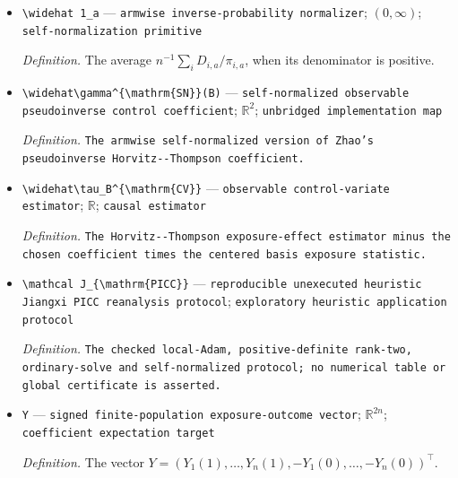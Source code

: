 \documentclass{article}
\begin{document}
\begin{itemize}
  \item \texttt{\textbackslash{}\allowbreak{}widehat 1\_\allowbreak{}a} --- \texttt{armwise inverse-\allowbreak{}probability normalizer}; \((0,\infty)\); \texttt{self-\allowbreak{}normalization primitive}
  \par\smallskip\noindent\emph{Definition.} The average \(n^{-1}\sum_iD_{i,a}/\pi_{i,a}\), when its denominator is positive.
  \item \texttt{\textbackslash{}\allowbreak{}widehat\textbackslash{}\allowbreak{}gamma\textasciicircum{}\{\textbackslash{}\allowbreak{}mathrm\{SN\}\allowbreak{}\}\allowbreak{}(B)} --- \texttt{self-\allowbreak{}normalized observable pseudoinverse control coefficient}; \(\mathbb R^2\); \texttt{unbridged implementation map}
  \par\smallskip\noindent\emph{Definition.} \texttt{The armwise self-\allowbreak{}normalized version of Zhao's pseudoinverse Horvitz-\allowbreak{}-\allowbreak{}Thompson coefficient.}
  \item \texttt{\textbackslash{}\allowbreak{}widehat\textbackslash{}\allowbreak{}tau\_\allowbreak{}B\textasciicircum{}\{\textbackslash{}\allowbreak{}mathrm\{CV\}\allowbreak{}\}\allowbreak{}} --- \texttt{observable control-\allowbreak{}variate estimator}; \(\mathbb R\); \texttt{causal estimator}
  \par\smallskip\noindent\emph{Definition.} \texttt{The Horvitz-\allowbreak{}-\allowbreak{}Thompson exposure-\allowbreak{}effect estimator minus the chosen coefficient times the centered basis exposure statistic.}
  \item \texttt{\textbackslash{}\allowbreak{}mathcal J\_\allowbreak{}\{\textbackslash{}\allowbreak{}mathrm\{PICC\}\allowbreak{}\}\allowbreak{}} --- \texttt{reproducible unexecuted heuristic Jiangxi PICC reanalysis protocol}; \texttt{exploratory heuristic application protocol}
  \par\smallskip\noindent\emph{Definition.} \texttt{The checked local-\allowbreak{}Adam,\allowbreak{} positive-\allowbreak{}definite rank-\allowbreak{}two,\allowbreak{} ordinary-\allowbreak{}solve and self-\allowbreak{}normalized protocol;\allowbreak{} no numerical table or global certificate is asserted.}
  \item \texttt{Y} --- \texttt{signed finite-\allowbreak{}population exposure-\allowbreak{}outcome vector}; \(\mathbb R^{2n}\); \texttt{coefficient expectation target}
  \par\smallskip\noindent\emph{Definition.} The vector \(Y=(Y_1(1),\ldots,Y_n(1),-Y_1(0),\ldots,-Y_n(0))^{\top}\).

\end{itemize}
\end{document}
